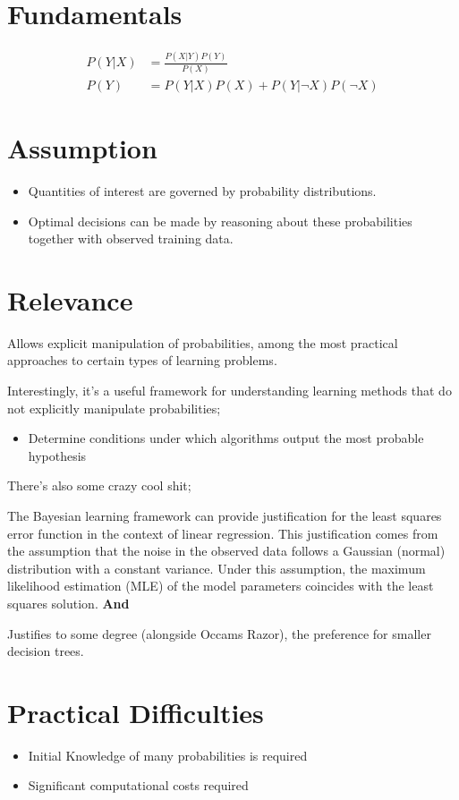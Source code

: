 \documentclass{article}
\begin{document}
\section{Fundamentals}
\begin{align*}
	P(Y|X) &= \frac{P(X|Y)P(Y)}{P(X)} \\
	P(Y) &= P(Y|X)P(X) + P(Y|\neg X)P(\neg X)
\end{align*}

\section{Assumption}
\begin{itemize}
	\item Quantities of interest are governed by probability distributions.
	\item Optimal decisions can be made by reasoning about these probabilities together with observed training data.
\end{itemize}

\section{Relevance}
Allows explicit manipulation of probabilities, among the most practical approaches to certain types of learning problems.

Interestingly, it's a useful framework for understanding learning methods that do not explicitly manipulate probabilities;
\begin{itemize}
	\item Determine conditions under which algorithms output the most probable hypothesis
\end{itemize}

There's also some crazy cool shit;

The Bayesian learning framework can provide justification for the least squares error function in the context of linear regression. This justification comes from the assumption that the noise in the observed data follows a Gaussian (normal) distribution with a constant variance. Under this assumption, the maximum likelihood estimation (MLE) of the model parameters coincides with the least squares solution. {\bf And }

Justifies to some degree (alongside Occams Razor), the preference for smaller decision trees.

\section{Practical Difficulties}
\begin{itemize}
	\item Initial Knowledge of many probabilities is required
	\item Significant computational costs required
\end{itemize}
\end{document}
